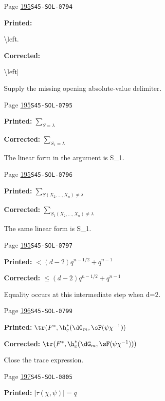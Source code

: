 \begin{description}
\smallskip
\item[\hypertarget{apparatus:EN-0124}{124}] Page \hyperlink{printpage:en:195}{195}\quad\texttt{S45-SOL-0794}
\par\noindent\textbf{Printed:} {\footnotesize\ttfamily\raggedright \textbackslash{}\allowbreak{}left.}
\par\noindent\textbf{Corrected:} {\footnotesize\ttfamily\raggedright \textbackslash{}\allowbreak{}left|}
\par\noindent Supply the missing opening absolute-value delimiter.
\smallskip
\item[\hypertarget{apparatus:EN-0125}{125}] Page \hyperlink{printpage:en:195}{195}\quad\texttt{S45-SOL-0795}
\par\noindent\textbf{Printed:} \(\sum_{S=\lambda}\)
\par\noindent\textbf{Corrected:} \(\sum_{S_1=\lambda}\)
\par\noindent The linear form in the argument is S\_1.
\smallskip
\item[\hypertarget{apparatus:EN-0126}{126}] Page \hyperlink{printpage:en:195}{195}\quad\texttt{S45-SOL-0796}
\par\noindent\textbf{Printed:} \(\sum_{S(X_2,\dots,X_n)\ne\lambda}\)
\par\noindent\textbf{Corrected:} \(\sum_{S_1(X_2,\dots,X_n)\ne\lambda}\)
\par\noindent The same linear form is S\_1.
\smallskip
\item[\hypertarget{apparatus:EN-0127}{127}] Page \hyperlink{printpage:en:195}{195}\quad\texttt{S45-SOL-0797}
\par\noindent\textbf{Printed:} \(< (d-2) q^{n-1/2} + q^{n-1}\)
\par\noindent\textbf{Corrected:} \(\leqslant (d-2) q^{n-1/2} + q^{n-1}\)
\par\noindent Equality occurs at this intermediate step when d=2.
\smallskip
\item[\hypertarget{apparatus:EN-0128}{128}] Page \hyperlink{printpage:en:196}{196}\quad\texttt{S45-SOL-0799}
\par\noindent\textbf{Printed:} \(\tr(F^\ast,\h_c^\ast(\dG_m,\sF(\psi \chi^{-1}))\)
\par\noindent\textbf{Corrected:} \(\tr(F^\ast,\h_c^\ast(\dG_m,\sF(\psi \chi^{-1})))\)
\par\noindent Close the trace expression.
\smallskip
\item[\hypertarget{apparatus:EN-0129}{129}] Page \hyperlink{printpage:en:197}{197}\quad\texttt{S45-SOL-0805}
\par\noindent\textbf{Printed:} \(|\tau(\chi,\psi)|=q\)

\end{description}
